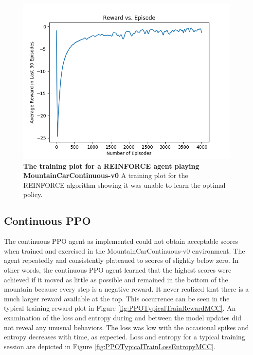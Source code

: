 \documentclass[conference]{IEEEtran}
\begin{document}
\begin{figure}[htbp]
\centerline{\includegraphics[scale=0.5]{REINFORCEMccTrain.png}}
\caption{\textbf{The training plot for a REINFORCE agent playing MountainCarContinuous-v0}  A training plot for the REINFORCE algorithm showing it was unable to learn the optimal policy.}
\label{fig:REINFORCEMccTrain}
\end{figure}

\subsection{Continuous PPO}
The continuous PPO agent as implemented could not obtain acceptable scores when trained and exercised in the MountainCarContinuous-v0 environment. The agent repeatedly and consistently plateaued to scores of slightly below zero. In other words, the continuous PPO agent learned that the highest scores were achieved if it moved as little as possible and remained in the bottom of the mountain because every step is a negative reward. It never realized that there is a much larger reward available at the top. This occurrence can be seen in the typical training reward plot in Figure \ref{fig:PPOTypicalTrainRewardMCC}. An examination of the loss and entropy during and between the model updates did not reveal any unusual behaviors. The loss was low with the occasional spikes and entropy decreases with time, as expected. Loss and entropy for a typical training session are depicted in Figure \ref{fig:PPOTypicalTrainLossEntropyMCC}.
\end{document}
